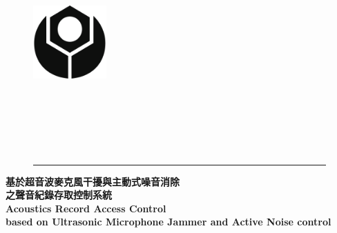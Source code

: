 \begin{titlepage}
    \begin{singlespace}
        \begin{center}
            \begin{figure}[htb]
                \begin{minipage}[c]{0cm} 
                    \raggedright
                    \includegraphics[width=1.1in]{style/logo.pdf}
                \end{minipage}
                \begin{minipage}[c]{\textwidth}
                    \centering
                    \\
                    \vspace{1cm}
                    \\
                    \vspace{1cm}
                    \\
                \end{minipage}
                \begin{minipage}[b]{\textwidth}
                    \raggedleft
                    \vspace{1cm}
                    \\
                \end{minipage}
                \rule{16cm}{3pt}
            \end{figure}
            \vspace{1.5cm}
            \bf\LARGE{基於超音波麥克風干擾與主動式噪音消除\\之聲音紀錄存取控制系統}\\
            \vspace{0.5cm}
            \bf\LARGE{Acoustics Record Access Control\\based on Ultrasonic Microphone Jammer and Active Noise control}\\

\end{center}
\end{singlespace}
\end{titlepage}
